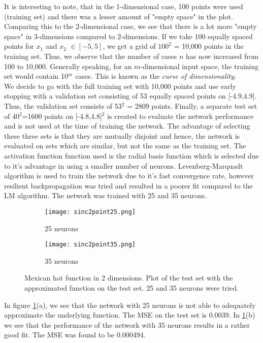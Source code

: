\documentclass[paper=a4, fontsize=11pt]{scrartcl} %
\numberwithin{equation}{section} %
\begin{document}
It is interesting to note, that in the 1-dimensional case, 100 points were used (training set) and there was a lesser amount of "empty space" in the plot. Comparing this to the 2-dimensional case, we see that there is a lot more "empty space" in 3-dimensions compared to 2-dimensions. If we take 100 equally spaced points for $x_1$ and $x_2$ $\in [-5,5]$, we get a grid of $100^2$ = 10,000 points in the training set. Thus, we observe that the number of cases $n$ has now increased from 100 to 10,000. Generally speaking, for an $m$-dimensional input space, the training set would contain 10$^m$ cases. This is known as the \emph{curse of dimensionality}.\\

We decide to go with the full training set with 10,000 points and use early stopping with a validation set consisting of 53 equally spaced points on [-4.9,4.9]. Thus, the validation set consists of 53$^2$ = 2809 points. Finally, a separate test set of 40$^2$=1600 points on [-4.8,4.8]$^2$ is created to evaluate the network performance and is not used at the time of training the network. The advantage of selecting these three sets is that they are mutually disjoint and hence, the network is evaluated on sets which are similar, but not the same as the training set. The activation function function used is the radial basis function which is selected due to it's advantage in using a smaller number of neurons. Levenberg-Marquadt algorithm is used to train the network due to it's fast convergence rate, however resilient backpropagation was tried and resulted in a poorer fit compared to the LM algorithm. The network was trained with 25 and 35 neurons. 

\begin{figure}[h]
	\begin{subfigure}{0.5\linewidth}
		\centering
		\texttt{[image: sinc2point25.png]}
		\caption{25 neurons}
	\end{subfigure}
	\begin{subfigure}{0.5\linewidth}
		\centering
		\texttt{[image: sinc2point35.png]}
		\caption{35 neurons}
	\end{subfigure}
\caption{Mexican hat function in 2 dimensions. Plot of the test set with the approximated function on the test set. 25 and 35 neurons were tried.}
\label{sinc2fit}
\end{figure}

In figure \ref{sinc2fit}(a), we see that the network with 25 neurons is not able to adequately approximate the underlying function. The MSE on the test set  is 0.0039. In \ref{sinc2fit}(b) we see that the performance of the network with 35 neurons results in a rather good fit. The MSE was found to be 0.000494.
\end{document}

